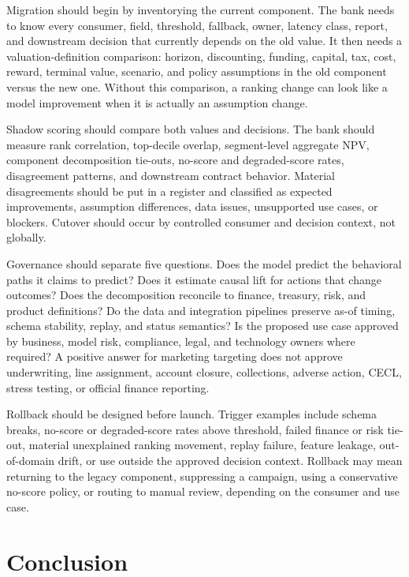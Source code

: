 \documentclass[11pt]{article}
\newcommand{\1}{\mathbf{1}}
\begin{document}
Migration should begin by inventorying the current component. The bank needs
to know every consumer, field, threshold, fallback, owner, latency class,
report, and downstream decision that currently depends on the old value. It
then needs a valuation-definition comparison: horizon, discounting, funding,
capital, tax, cost, reward, terminal value, scenario, and policy assumptions
in the old component versus the new one. Without this comparison, a ranking
change can look like a model improvement when it is actually an assumption
change.

Shadow scoring should compare both values and decisions. The bank should
measure rank correlation, top-decile overlap, segment-level aggregate NPV,
component decomposition tie-outs, no-score and degraded-score rates,
disagreement patterns, and downstream contract behavior. Material
disagreements should be put in a register and classified as expected
improvements, assumption differences, data issues, unsupported use cases, or
blockers. Cutover should occur by controlled consumer and decision context,
not globally.

Governance should separate five questions. Does the model predict the
behavioral paths it claims to predict? Does it estimate causal lift for actions
that change outcomes? Does the decomposition reconcile to finance, treasury,
risk, and product definitions? Do the data and integration pipelines preserve
as-of timing, schema stability, replay, and status semantics? Is the proposed
use case approved by business, model risk, compliance, legal, and technology
owners where required? A positive answer for marketing targeting does not
approve underwriting, line assignment, account closure, collections, adverse
action, CECL, stress testing, or official finance reporting.

Rollback should be designed before launch. Trigger examples include schema
breaks, no-score or degraded-score rates above threshold, failed finance or
risk tie-out, material unexplained ranking movement, replay failure, feature
leakage, out-of-domain drift, or use outside the approved decision context.
Rollback may mean returning to the legacy component, suppressing a campaign,
using a conservative no-score policy, or routing to manual review, depending
on the consumer and use case.

\section{Conclusion}
\label{sec:conclusion}
\end{document}
